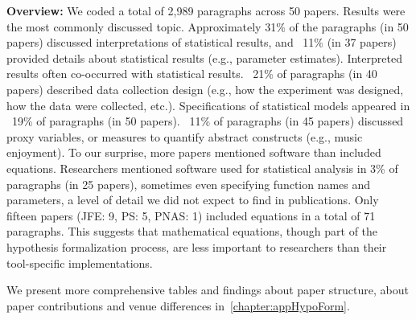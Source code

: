 \noindent\textbf{Overview:} We coded a total of 2,989 paragraphs across 50 papers. Results were the most
commonly discussed topic. Approximately 31\% of the paragraphs (in 50 papers)
discussed interpretations of statistical results, and ~11\% (in 37 papers)
provided details about statistical results (e.g., parameter estimates).
Interpreted results often co-occurred with statistical results. ~21\% of
paragraphs (in 40 papers) described data collection design (e.g., how the
experiment was designed, how the data were collected, etc.). Specifications of
statistical models appeared in ~19\% of paragraphs (in 50 papers). ~11\% of
paragraphs (in 45 papers) discussed proxy variables, or measures to quantify
abstract constructs (e.g., music enjoyment). To our surprise, more papers
mentioned software than included equations. Researchers mentioned software used
for statistical analysis in 3\% of paragraphs (in 25 papers), sometimes even
specifying function names and parameters, a level of detail we did not expect to
find in publications. Only fifteen papers (JFE: 9, PS: 5, PNAS: 1) included
equations in a total of 71 paragraphs. This suggests that mathematical
equations, though part of the hypothesis formalization process, are less
important to researchers than their tool-specific implementations.


We present more comprehensive tables and findings about paper structure, about paper
contributions and venue differences in~\autoref{chapter:appHypoForm}.


